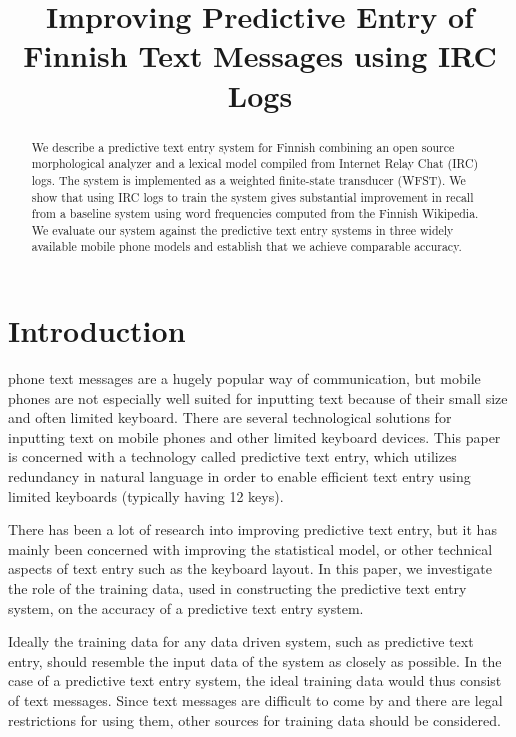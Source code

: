 \documentclass[a4paper,conference]{IEEEtran}
\title{Improving Predictive Entry of Finnish Text Messages using IRC Logs}
\author{
\IEEEauthorblockA{\ldots\\
\ldots\\
\ldots\\
\ldots}
\and
\IEEEauthorblockA{\ldots\\
\ldots\\
\ldots\\
\ldots}
\and
\IEEEauthorblockA{\ldots\\
\ldots\\
\ldots\\
\ldots}
}
\begin{document}
\maketitle


\begin{abstract}
We describe a predictive text entry system for Finnish combining an
open source morphological analyzer and a lexical model compiled from
Internet Relay Chat (IRC) logs. The system is implemented as a
weighted finite-state transducer (WFST). We show that using IRC logs
to train the system gives substantial improvement in recall from a
baseline system using word frequencies computed from the Finnish
Wikipedia. We evaluate our system against the predictive text entry
systems in three widely available mobile phone models and establish that we
achieve comparable accuracy.
\end{abstract}

\section{Introduction}
\label{sec:introduction}

 phone text messages are a hugely popular way
of communication, but mobile phones are not especially well suited for
inputting text because of their small size and often limited
keyboard. There are several technological solutions for inputting text
on mobile phones and other limited keyboard devices. This paper is
concerned with a technology called predictive text entry, which utilizes
redundancy in natural language in order to enable efficient text entry
using limited keyboards (typically having 12 keys).

There has been a lot of research into improving predictive text entry,
but it has mainly been concerned with improving the statistical model,
or other technical aspects of text entry such as the keyboard
layout. In this paper, we investigate the role of the training data,
used in constructing the predictive text entry system, on the accuracy
of a predictive text entry system.

Ideally the training data for any data driven system, such as
predictive text entry, should resemble the input data of the system as
closely as possible. In the case of a predictive text entry system,
the ideal training data would thus consist of text messages. Since
text messages are difficult to come by and there are legal
restrictions for using them, other sources for training data should be
considered.
\end{document}
